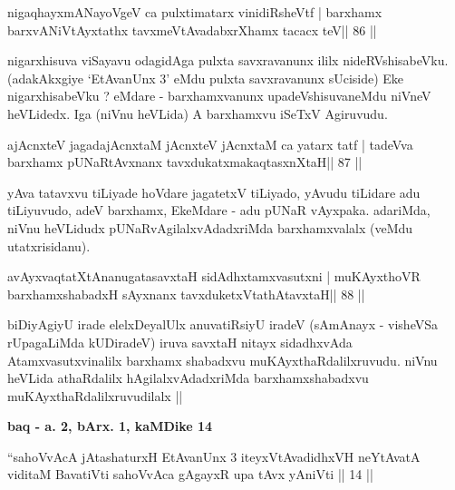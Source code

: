 \begin{shl}
nigaqhayxmANayoVgeV ca pulxtimatarx vinidiRsheVtf |
barxhamx barxvANiVtAyxtathx tavxmeVtAvadabxrXhamx tacacx teV\hfill || 86 ||
\end{shl}

\begin{artha}
nigarxhisuva viSayavu odagidAga pulxta savxravanunx ililx  nideRVshisabeVku. (adakAkxgiye `EtAvanUnx 3' eMdu pulxta savxravanunx  sUciside) Eke nigarxhisabeVku ? eMdare - barxhamxvanunx upadeVshisuvaneMdu niVneV heVLidedx. Iga (niVnu heVLida) A barxhamxvu iSeTxV Agiruvudu.
\end{artha}


\begin{shl}
ajAcnxteV jagadajAcnxtaM jAcnxteV jAcnxtaM ca yatarx tatf |
tadeVva barxhamx pUNaRtAvxnanx tavxdukatxmakaqtasxnXtaH\hfill || 87 ||
\end{shl}

\begin{artha}
yAva tatavxvu tiLiyade hoVdare jagatetxV tiLiyado, yAvudu tiLidare adu  tiLiyuvudo, adeV barxhamx, EkeMdare - adu pUNaR vAyxpaka. adariMda, niVnu heVLidudx pUNaRvAgilalxvAdadxriMda barxhamxvalalx (veMdu utatxrisidanu).
\end{artha}

\begin{shl}
avAyxvaqtatXtAnanugatasavxtaH sidAdhxtamxvasutxni |
muKAyxthoVR barxhamxshabadxH sAyxnanx tavxduketxV\s tathAtavxtaH\hfill || 88 ||
\end{shl}

\begin{artha}
biDiyAgiyU irade elelxDeyalUlx anuvatiRsiyU iradeV (sAmAnayx - visheVSa rUpagaLiMda kUDiradeV) iruva savxtaH nitayx sidadhxvAda Atamxvasutxvinalilx barxhamx shabadxvu muKAyxthaRdalilxruvudu. niVnu heVLida athaRdalilx hAgilalxvAdadxriMda barxhamxshabadxvu muKAyxthaRdalilxruvudilalx ||
\end{artha} 

\begin{center}
{\large\textbf{baq - a. 2, bArx. 1, kaMDike 14}}
\end{center}

\begin{shl}
``sahoVvAcA jAtashaturxH EtAvanUnx 3 iteyxVtAvadidhxVH
neYtAvatA viditaM BavatiVti sahoVvAca gAgayxR
upa tAvx yAniVti || 14 ||
\end{shl}


